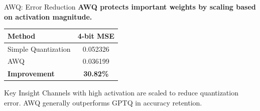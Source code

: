 \documentclass[aspectratio=169,10pt]{beamer}
\begin{document}
\begin{frame}{AWQ: Error Reduction}
    \textbf{AWQ protects important weights by scaling based on activation magnitude.}

    \vspace{0.3cm}
    \begin{table}
        \centering
        \small
        \begin{tabular}{lc}
            \toprule
            \textbf{Method} & \textbf{4-bit MSE} \\
            \midrule
            Simple Quantization & 0.052326 \\
            AWQ & 0.036199 \\
            \midrule
            \textbf{Improvement} & \textbf{30.82\%} \\
            \bottomrule
        \end{tabular}
    \end{table}

    \vspace{0.5cm}


    \vspace{0.3cm}
    \begin{block}{Key Insight}
        Channels with high activation are scaled to reduce quantization error. AWQ generally outperforms GPTQ in accuracy retention.
    \end{block}
\end{frame}
\end{document}
